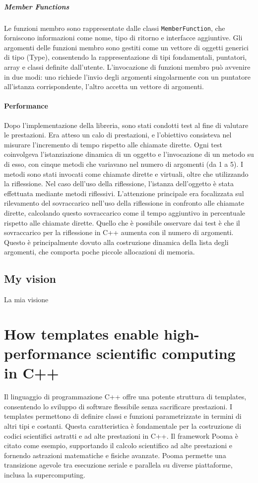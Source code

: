 \documentclass[11pt]{article}
\begin{document}
\begin{multicols*}{2}[\columnsep=1cm]
    \subparagraph*{Member Functions}
    Le funzioni membro sono rappresentate dalle classi \texttt{MemberFunction}, che forniscono informazioni come nome, tipo di ritorno e interfacce aggiuntive.
    Gli argomenti delle funzioni membro sono gestiti come un vettore di oggetti generici di tipo (Type), consentendo la rappresentazione di tipi fondamentali, puntatori, array e classi definite dall'utente.
    L'invocazione di funzioni membro può avvenire in due modi: uno richiede l'invio degli argomenti singolarmente con un puntatore all'istanza corrispondente, l'altro accetta un vettore di argomenti.

    \paragraph{Performance}
    Dopo l'implementazione della libreria, sono stati condotti test al fine di valutare le prestazioni. Era atteso un calo di prestazioni, e l'obiettivo consisteva nel misurare l'incremento di tempo rispetto alle chiamate dirette. Ogni test coinvolgeva l'istanziazione dinamica di un oggetto e l'invocazione di un metodo su di esso, con cinque metodi che variavano nel numero di argomenti (da 1 a 5). I metodi sono stati invocati come chiamate dirette e virtuali, oltre che utilizzando la riflessione. Nel caso dell'uso della riflessione, l'istanza dell'oggetto è stata effettuata mediante metodi riflessivi. L'attenzione principale era focalizzata sul rilevamento del sovraccarico nell'uso della riflessione in confronto alle chiamate dirette, calcolando questo sovraccarico come il tempo aggiuntivo in percentuale rispetto alle chiamate dirette.
    Quello che è possibile osservare dai test è che il sovraccarico per la riflessione in C++ aumenta con il numero di argomenti. Questo è principalmente dovuto alla costruzione dinamica della lista degli argomenti, che comporta poche piccole allocazioni di memoria. 
    \subsection{My vision}
    La mia visione

\section{How templates enable high-performance scientific computing in C++}
    Il linguaggio di programmazione C++ offre una potente struttura di templates, consentendo lo sviluppo di software flessibile senza sacrificare prestazioni. I templates permettono di definire classi e funzioni parametrizzate in termini di altri tipi e costanti. Questa caratteristica è fondamentale per la costruzione di codici scientifici astratti e ad alte prestazioni in C++. Il framework Pooma è citato come esempio, supportando il calcolo scientifico ad alte prestazioni e fornendo astrazioni matematiche e fisiche avanzate. 
    Pooma permette una transizione agevole tra esecuzione seriale e parallela su diverse piattaforme, inclusa la supercomputing.

\end{multicols*}
\end{document}
